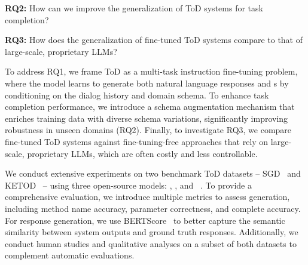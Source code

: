 \noindent
\textbf{RQ2:} How can we improve the {\ood} generalization of ToD systems for task completion?

\noindent
\textbf{RQ3:} How does the {\ood} generalization of fine-tuned ToD systems compare to that of large-scale, proprietary LLMs?


To address RQ1, we frame ToD as a multi-task instruction fine-tuning problem, where the model learns to generate both natural language responses and {\apicall}s by conditioning on the dialog history and domain schema. 
To enhance task completion performance, we introduce a schema augmentation mechanism that enriches training data with diverse schema variations, significantly improving robustness in unseen domains (RQ2). Finally, to investigate RQ3, we compare fine-tuned ToD systems against fine-tuning-free approaches that rely on large-scale, proprietary LLMs, which are often costly and less controllable.


We conduct extensive experiments on two benchmark ToD datasets -- SGD~\cite{Rastogi2019TowardsSM} and KETOD~\cite{Chen2022KETODKT} -- using three open-source models: {\gpt}\cite{radford2019language}, {\llamai}, and {\flan}~\cite{Chung2022ScalingIL}. To provide a comprehensive evaluation, we introduce multiple metrics to assess {\apicall} generation, including method name accuracy, parameter correctness, and complete {\apicall} accuracy. For response generation, we use BERTScore~\cite{Zhang2019BERTScoreET} to better capture the semantic similarity between system outputs and ground truth responses. Additionally, we conduct human studies and qualitative analyses on a subset of both datasets to complement automatic evaluations.



